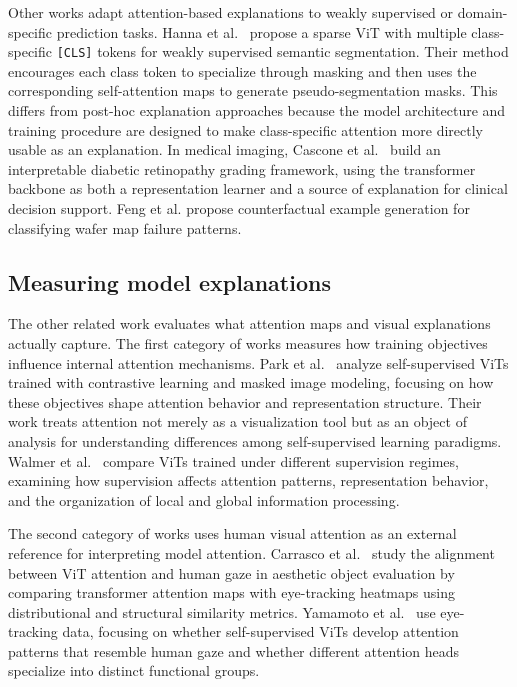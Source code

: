 \documentclass[lineno,pdflatex,sn-mathphys-num]{sn-jnl}%
\theoremstyle{thmstyleone}%
\theoremstyle{thmstyletwo}%
\theoremstyle{thmstylethree}%
\begin{document}
Other works adapt attention-based explanations to weakly supervised or domain-specific prediction tasks. Hanna et al.~\cite{Hanna25ICCV} propose a sparse ViT with multiple class-specific \texttt{[CLS]} tokens for weakly supervised semantic segmentation. Their method encourages each class token to specialize through masking and then uses the corresponding self-attention maps to generate pseudo-segmentation masks. This differs from post-hoc explanation approaches because the model architecture and training procedure are designed to make class-specific attention more directly usable as an explanation. In medical imaging, Cascone et al.~\cite{Cascone25ICCV} build an interpretable diabetic retinopathy grading framework, using the transformer backbone as both a representation learner and a source of explanation for clinical decision support. Feng et al. \cite{Feng2025AI} propose counterfactual example generation for classifying wafer map failure patterns.


\subsection{Measuring model explanations}

The other related work evaluates what attention maps and visual explanations actually capture. The first category of works measures how training objectives influence internal attention mechanisms. Park et al.~\cite{park2023what} analyze self-supervised ViTs trained with contrastive learning and masked image modeling, focusing on how these objectives shape attention behavior and representation structure. Their work treats attention not merely as a visualization tool but as an object of analysis for understanding differences among self-supervised learning paradigms. Walmer et al.~\cite{Walmer23CVPR} compare ViTs trained under different supervision regimes, examining how supervision affects attention patterns, representation behavior, and the organization of local and global information processing. 

The second category of works uses human visual attention as an external reference for interpreting model attention. Carrasco et al.~\cite{Carrasco2026} study the alignment between ViT attention and human gaze in aesthetic object evaluation by comparing transformer attention maps with eye-tracking heatmaps using distributional and structural similarity metrics. Yamamoto et al.~\cite{Yamamoto2025} use eye-tracking data, focusing on whether self-supervised ViTs develop attention patterns that resemble human gaze and whether different attention heads specialize into distinct functional groups. 
\end{document}
